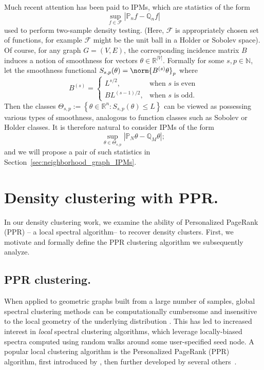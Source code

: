 \documentclass{article}
\newcommand{\Reals}{\mathbb{R}}
\newcommand{\abs}[1]{\left \lvert #1 \right \rvert}
\newcommand{\set}[1]{\left\{#1\right\}}
\newcommand{\1}{\mathbf{1}}
\theoremstyle{alden}
\theoremstyle{aldenthm}
\theoremstyle{definition}
\theoremstyle{remark}
\begin{document}
Much recent attention \citet{muller97,sriperumbudur09,gretton12,mroueh17} has been paid to IPMs, which are statistics of the form
\begin{equation*}
\sup_{f \in \mathcal{F}} \abs{\mathbb{P}_n f - \mathbb{Q}_n f}
\end{equation*}
used to perform two-sample density testing. (Here, $\mathcal{F}$ is appropriately chosen set of functions, for example $\mathcal{F}$ might be the unit ball in a Holder or Sobolev space). Of course, for any graph $G = (V,E)$, the corresponding incidence matrix $B$ induces a notion of smoothness for vectors $\theta \in \Reals^{\abs{V}}$. Formally for some $s,p \in \mathbb{N}$, let the smoothness functional $S_{s,p}(\theta) = \norm{B^{(s)}\theta}_p$ where
\begin{equation*}
B^{(s)} = 
\begin{cases}
L^{s/2}, & \textrm{when $s$ is even} \\
B L^{(s-1)/2}, & \textrm{when $s$ is odd.}
\end{cases}
\end{equation*}
Then the classes $\Theta_{s,p} := \set{\theta \in \Reals^n: S_{s,p}(\theta) \leq L}$ can be viewed as possessing various types of smoothness, analogous to function classes such as Sobolev or Holder classes. It is therefore natural to consider IPMs of the form
\begin{equation*}
\sup_{\theta \in \Theta_{s,p}} \abs{\mathbb{P}_N \theta - \mathbb{Q}_M \theta};
\end{equation*}
and we will propose a pair of such statistics in Section~\ref{sec:neighborhood_graph_IPMs}.

\section{Density clustering with PPR.}
\label{sec:density_clustering_PPR}

In our density clustering work, we examine the ability of Personalized PageRank (PPR) -- a local spectral algorithm-- to recover density clusters. First, we motivate and formally define the PPR clustering algorithm we subsequently analyze. 

\subsection{PPR clustering.}

When applied to geometric graphs built from a large number of samples,
global spectral clustering methods can be computationally cumbersome and   
insensitive to the local geometry of the underlying distribution
\citep{leskovec2010,mahoney2012}.  This has led to increased interest in
\emph{local} spectral clustering algorithms, which leverage locally-biased spectra
computed using random walks around some user-specified seed node.  A popular 
local clustering algorithm is the Personalized PageRank (PPR) algorithm, first introduced by 
\citet{haveliwala2003}, then further developed by
several others~\citep{spielman2011,spielman2014,andersen2006,mahoney2012,zhu2013}.
\end{document}

